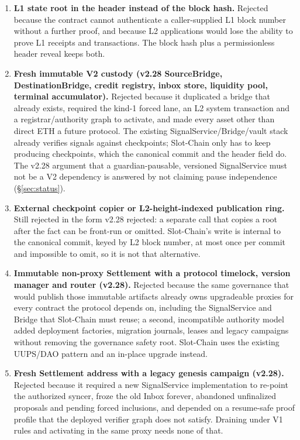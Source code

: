 \documentclass[a4paper,11pt]{article}
\begin{document}
\begin{enumerate}
Rejected in favour of the header field.  A system transaction needs a custom
transaction type, reserved senders, fee carve-outs, gas reservations and
guest-side re-derivation in every client and prover, and it is exactly the
machinery whose removal the baseline protocol has already decided.  The header
field is validated by the same clients that already validate every other
header field, is recorded by the unmodified EIP-4788 call, and leaves the L2
EVM standard.
\item \textbf{L1 state root in the header instead of the block hash.}
Rejected because the contract cannot authenticate a caller-supplied L1 block
number without a further proof, and because L2 applications would lose the
ability to prove L1 receipts and transactions.  The block hash plus a
permissionless header reveal keeps both.
\item \textbf{Fresh immutable V2 custody (v2.28 SourceBridge, DestinationBridge,
credit registry, inbox store, liquidity pool, terminal accumulator).}
Rejected because it duplicated a bridge that already exists, required the
kind-1 forced lane, an L2 system transaction and a registrar/authority graph
to activate, and made every asset other than direct ETH a future protocol.
The existing SignalService/Bridge/vault stack already verifies signals against
checkpoints; Slot-Chain only has to keep producing checkpoints, which the
canonical commit and the header field do.  The v2.28 argument that a
guardian-pausable, versioned SignalService must not be a V2 dependency is
answered by not claiming pause independence (\S\ref{sec:status}).
\item \textbf{External checkpoint copier or L2-height-indexed publication
ring.} Still rejected in the form v2.28 rejected: a separate call that copies
a root after the fact can be front-run or omitted.  Slot-Chain's write is
internal to the canonical commit, keyed by L2 block number, at most once per
commit and impossible to omit, so it is not that alternative.
\item \textbf{Immutable non-proxy Settlement with a protocol timelock, version
manager and router (v2.28).} Rejected because the same governance that would
publish those immutable artifacts already owns upgradeable proxies for every
contract the protocol depends on, including the SignalService and Bridge that
Slot-Chain must reuse; a second, incompatible authority model added deployment
factories, migration journals, leases and legacy campaigns without removing
the governance safety root.  Slot-Chain uses the existing UUPS/DAO pattern and
an in-place upgrade instead.
\item \textbf{Fresh Settlement address with a legacy genesis campaign
(v2.28).} Rejected because it required a new SignalService implementation to
re-point the authorized syncer, froze the old Inbox forever, abandoned
unfinalized proposals and pending forced inclusions, and depended on a
resume-safe proof profile that the deployed verifier graph does not satisfy.
Draining under V1 rules and activating in the same proxy needs none of that.
\end{enumerate}
\end{document}
